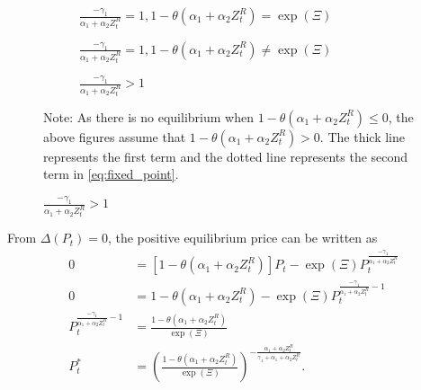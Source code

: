 \documentclass[11pt, a4paper]{article}
\theoremstyle{remark}
\begin{document}
\begin{figure}[!ht]
    \vspace{1em}
    \begin{subfigure}{0.45\textwidth}
         \caption{$\frac{-\gamma_1}{\alpha_1 + \alpha_2 Z^{R}_{t}} = 1, 1-\theta(\alpha_1+\alpha_2 Z_t^R) = \exp(\Xi) $}
         \label{fig:fixed_coinside}
    \end{subfigure}
    \hfill
    \begin{subfigure}{0.45\textwidth}
         \caption{$\frac{-\gamma_1}{\alpha_1 + \alpha_2 Z^{R}_{t}} = 1, 1-\theta(\alpha_1+\alpha_2 Z_t^R) \ne \exp(\Xi) $}
         \label{fig:fixed_parallel}
    \end{subfigure}
    \vspace{1em}
    \begin{subfigure}{0.4\textwidth}
         \caption{$\frac{-\gamma_1}{\alpha_1 + \alpha_2 Z^{R}_{t}}> 1$}
         \label{fig:fixed_convex}
    \end{subfigure}
    
    \footnotesize
    Note: As there is no equilibrium when $1- \theta(\alpha_1 + \alpha_2 Z^{R}_{t}) \le 0$, the above figures assume that $1- \theta(\alpha_1 + \alpha_2 Z^{R}_{t}) > 0$.
    The thick line represents the first term and the dotted line represents the second term in \eqref{eq:fixed_point}.
\end{figure}


From $\Delta (P_t) = 0$, the positive equilibrium price can be written as 
\begin{align}
    0 & = [1-\theta(\alpha_1 + \alpha_2 Z^{R}_{t})]P_t - \exp(\Xi) P_t^{\frac{-\gamma_1}{\alpha_1 + \alpha_2 Z^{R}_{t}}}\nonumber \\ 
    0 & = 1-\theta(\alpha_1 + \alpha_2 Z^{R}_{t}) - \exp(\Xi)P_t^{\frac{-\gamma_1}{\alpha_1 + \alpha_2 Z^{R}_{t}}- 1} \nonumber\\ 
    P_t^{\frac{-\gamma_1}{\alpha_1 + \alpha_2 Z^{R}_{t}}- 1} & = \frac{1-\theta(\alpha_1 + \alpha_2 Z^{R}_{t})}{ \exp(\Xi)}\nonumber\\ 
    P_{t}^* &= \left(\frac{1-\theta(\alpha_1 + \alpha_2 Z^{R}_{t})}{\exp(\Xi)}\right)^{-\frac{\alpha_1 + \alpha_2 Z^{R}_{t}}{\gamma_1 +\alpha_1 + \alpha_2 Z^{R}_{t}}}.
\end{align} 
\end{document}
